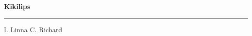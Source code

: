 \documentclass[10pt]{book}
\begin{document}
{
  \samepage
  \raggedbottom
  \raggedright
  \sloppy


  \vspace{0.2in}

  \noindent\begin{minipage}{.1\textwidth}
    \hfill\vspace{0.1in}
  \end{minipage}%
  \noindent\begin{minipage}{.8\textwidth}
    \centering
    \bfseries
    \large Kikilips
  \end{minipage}%
  \noindent\begin{minipage}{.1\textwidth}
      \hfill\vspace{0.1in}
  \end{minipage}

  \nopagebreak[4]
  \vspace{0.1in}
  \nopagebreak[4]
  \hrule height 0.05ex
  \nopagebreak[4]
  \vspace{-0.05in}

  {\footnotesize I. Linna \hfill C. Richard }\\
  \vspace{0.01in}



}
\end{document}
